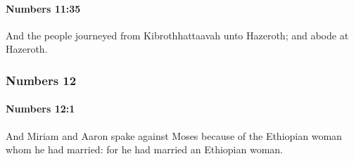 		\paragraph{Numbers 11:35} %
			\label{NUMBERS-11-35}

			And the people journeyed from Kibrothhattaavah unto Hazeroth; and abode at Hazeroth.

	\subsubsection{Numbers 12} %
		\label{NUMBERS-12}

		\paragraph{Numbers 12:1} %
			\label{NUMBERS-12-1}

			And Miriam and Aaron spake against Moses because of the Ethiopian woman whom he had married: for he had married an Ethiopian woman.

